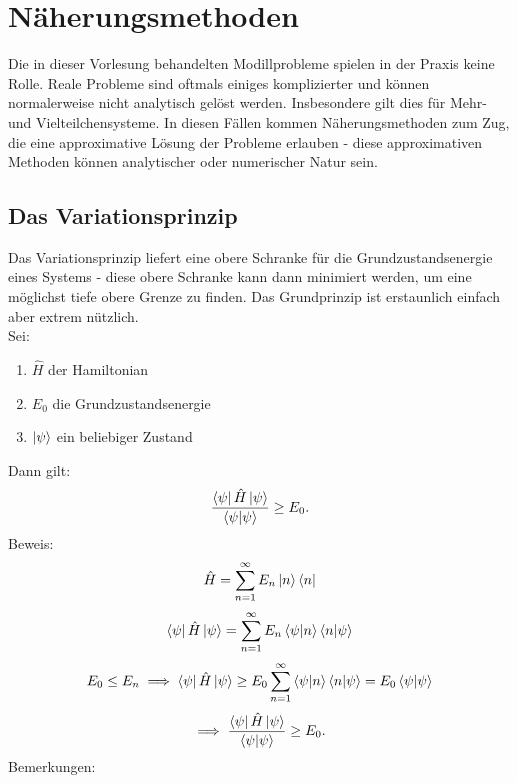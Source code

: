 \documentclass{report}
\begin{document}
\chapter{Näherungsmethoden}
Die in dieser Vorlesung behandelten Modillprobleme spielen in der Praxis keine Rolle. Reale Probleme sind oftmals einiges komplizierter und können normalerweise nicht analytisch gelöst werden. 
Insbesondere gilt dies für Mehr- und Vielteilchensysteme.
In diesen Fällen kommen Näherungsmethoden zum Zug, die eine approximative Lösung der Probleme erlauben - diese approximativen Methoden können analytischer oder numerischer Natur sein.
\section{Das Variationsprinzip}
Das Variationsprinzip liefert eine obere Schranke für die Grundzustandsenergie eines Systems - diese obere Schranke kann dann minimiert werden, um eine möglichst tiefe obere Grenze zu finden. Das Grundprinzip ist erstaunlich einfach aber extrem nützlich.\\ 
Sei:
\begin{enumerate}
	\item $\hat{H}$ der Hamiltonian
	\item $E_0$ die Grundzustandsenergie
	\item $\ket{\psi}$ ein beliebiger Zustand
\end{enumerate}
Dann gilt:  \[
\frac{\bra{\psi}\hat{H}\ket{\psi}  }{\bra{\psi}\ket{\psi}  } \ge E_0
.\] Beweis:  \[
\hat{H} = \sum_{n=1}^{\infty} E_n \ket{n} \bra{n}  \] \[
\bra{\psi} \hat{H} \ket{\psi} = \sum_{n=1}^{\infty} E_n \bra{\psi}\ket{n}\bra{n}\ket{\psi} \] \[
E_0 \le E_n \implies \bra{\psi} \hat{H} \ket{\psi} \ge E_0 \sum_{n=1}^{\infty} \bra{\psi}\ket{n} \bra{n} \ket{\psi} = E_0 \bra{\psi}\ket{\psi} \]\[
\implies \frac{\bra{\psi} \hat{H} \ket{\psi}  }{\bra{\psi} \ket{ \psi}  } \ge E_0
.\] 
Bemerkungen:
\end{document}
